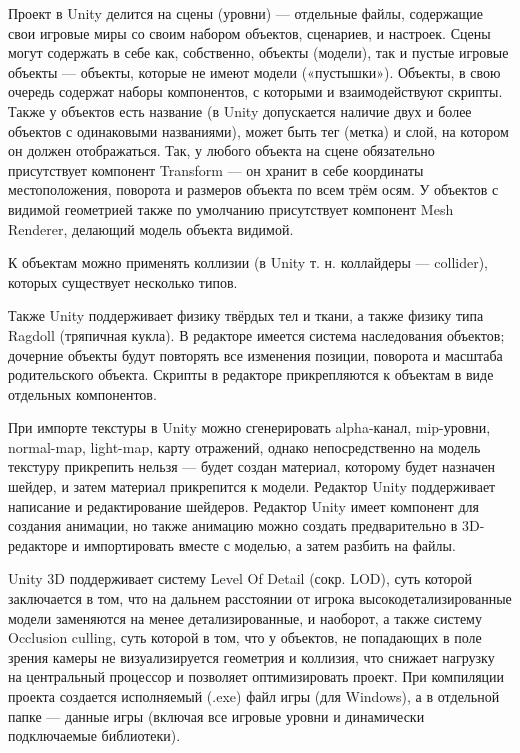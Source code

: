 Проект в Unity делится на сцены (уровни) — отдельные файлы, содержащие свои игровые миры со своим набором объектов, сценариев, и настроек. Сцены могут содержать в себе как, собственно, объекты (модели), так и пустые игровые объекты — объекты, которые не имеют модели («пустышки»). Объекты, в свою очередь содержат наборы компонентов, с которыми и взаимодействуют скрипты. Также у объектов есть название (в Unity допускается наличие двух и более объектов с одинаковыми названиями), может быть тег (метка) и слой, на котором он должен отображаться. Так, у любого объекта на сцене обязательно присутствует компонент Transform — он хранит в себе координаты местоположения, поворота и размеров объекта по всем трём осям. У объектов с видимой геометрией также по умолчанию присутствует компонент Mesh Renderer, делающий модель объекта видимой.

К объектам можно применять коллизии (в Unity т. н. коллайдеры — collider), которых существует несколько типов.

Также Unity поддерживает физику твёрдых тел и ткани, а также физику типа Ragdoll (тряпичная кукла). В редакторе имеется система наследования объектов; дочерние объекты будут повторять все изменения позиции, поворота и масштаба родительского объекта. Скрипты в редакторе прикрепляются к объектам в виде отдельных компонентов.

При импорте текстуры в Unity можно сгенерировать alpha-канал, mip-уровни, normal-map, light-map, карту отражений, однако непосредственно на модель текстуру прикрепить нельзя — будет создан материал, которому будет назначен шейдер, и затем материал прикрепится к модели. Редактор Unity поддерживает написание и редактирование шейдеров. Редактор Unity имеет компонент для создания анимации, но также анимацию можно создать предварительно в 3D-редакторе и импортировать вместе с моделью, а затем разбить на файлы.

Unity 3D поддерживает систему Level Of Detail (сокр. LOD), суть которой заключается в том, что на дальнем расстоянии от игрока высокодетализированные модели заменяются на менее детализированные, и наоборот, а также систему Occlusion culling, суть которой в том, что у объектов, не попадающих в поле зрения камеры не визуализируется геометрия и коллизия, что снижает нагрузку на центральный процессор и позволяет оптимизировать проект. При компиляции проекта создается исполняемый (.exe) файл игры (для Windows), а в отдельной папке — данные игры (включая все игровые уровни и динамически подключаемые библиотеки).

